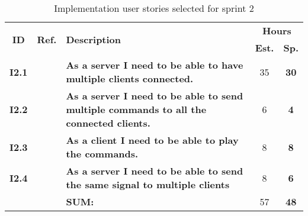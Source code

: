  \def\arraystretch{1.25}
 
\begin{longtable}{ccXcc}
\label{tab:sprint2stories}\\[-6mm]
\caption{Implementation user stories selected for sprint 2}\\[-4mm]
\toprule[0.5mm]
\multirow{2}{*}{\textbf{ID}} &
\multirow{2}{*}{\textbf{Ref.}} & \multirow{2}{*}{\textbf{Description}} & \multicolumn{2}{c}{\textbf{Hours}} \\
 				& & & \textbf{Est.} & \textbf{Sp.} \\ 				
\midrule

\textbf{I2.1} 	& {?} & {\bf As a server I need to be able to have multiple clients connected.} 							& 	35	& \textbf{30} \\
	
\textbf{I2.2} 	& {?} & {\bf As a server I need to be able to send multiple commands to all the connected clients.} 		& 	6	& \textbf{4} \\

\textbf{I2.3} 	& {?} & {\bf  As a client I need to be able to play the commands.}										& 	8	& \textbf{8} \\
\textbf{I2.4} 	& {?} & {\bf  As a server I need to be able to send the same signal to multiple clients} 				& 	8	& \textbf{6} \\		
				
\hline
				&& \textbf{SUM:}		&		57	& \textbf{48}\\																			
\bottomrule[0.5mm]
\end{longtable}